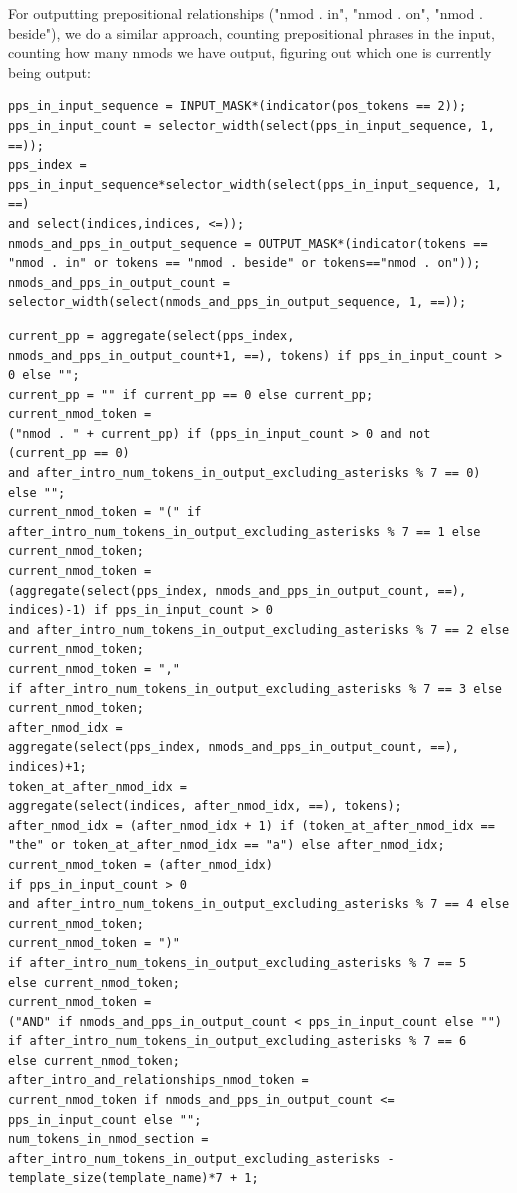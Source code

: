 \documentclass[11pt]{article}
\begin{document}
For outputting prepositional relationships ("nmod . in", "nmod . on", "nmod . beside"), we do a similar approach, counting prepositional phrases in the input, counting how many nmods we have output, figuring out which one is currently being output:

\begin{tiny}
\begin{verbatim}
pps_in_input_sequence = INPUT_MASK*(indicator(pos_tokens == 2));
pps_in_input_count = selector_width(select(pps_in_input_sequence, 1, ==));
pps_index = pps_in_input_sequence*selector_width(select(pps_in_input_sequence, 1, ==) 
and select(indices,indices, <=));
nmods_and_pps_in_output_sequence = OUTPUT_MASK*(indicator(tokens == "nmod . in" or tokens == "nmod . beside" or tokens=="nmod . on"));
nmods_and_pps_in_output_count = selector_width(select(nmods_and_pps_in_output_sequence, 1, ==));
\end{verbatim}
\end{tiny}

\begin{tiny}
\begin{verbatim}
current_pp = aggregate(select(pps_index, nmods_and_pps_in_output_count+1, ==), tokens) if pps_in_input_count > 0 else "";
current_pp = "" if current_pp == 0 else current_pp;
current_nmod_token = 
("nmod . " + current_pp) if (pps_in_input_count > 0 and not (current_pp == 0) 
and after_intro_num_tokens_in_output_excluding_asterisks % 7 == 0) else "";
current_nmod_token = "(" if after_intro_num_tokens_in_output_excluding_asterisks % 7 == 1 else current_nmod_token;
current_nmod_token = 
(aggregate(select(pps_index, nmods_and_pps_in_output_count, ==), indices)-1) if pps_in_input_count > 0 
and after_intro_num_tokens_in_output_excluding_asterisks % 7 == 2 else current_nmod_token;
current_nmod_token = "," 
if after_intro_num_tokens_in_output_excluding_asterisks % 7 == 3 else current_nmod_token;
after_nmod_idx = 
aggregate(select(pps_index, nmods_and_pps_in_output_count, ==), indices)+1;
token_at_after_nmod_idx = 
aggregate(select(indices, after_nmod_idx, ==), tokens);
after_nmod_idx = (after_nmod_idx + 1) if (token_at_after_nmod_idx == "the" or token_at_after_nmod_idx == "a") else after_nmod_idx;
current_nmod_token = (after_nmod_idx) 
if pps_in_input_count > 0 
and after_intro_num_tokens_in_output_excluding_asterisks % 7 == 4 else current_nmod_token;
current_nmod_token = ")" 
if after_intro_num_tokens_in_output_excluding_asterisks % 7 == 5 
else current_nmod_token;
current_nmod_token = 
("AND" if nmods_and_pps_in_output_count < pps_in_input_count else "") 
if after_intro_num_tokens_in_output_excluding_asterisks % 7 == 6 
else current_nmod_token;
after_intro_and_relationships_nmod_token = 
current_nmod_token if nmods_and_pps_in_output_count <= pps_in_input_count else "";
num_tokens_in_nmod_section = 
after_intro_num_tokens_in_output_excluding_asterisks - template_size(template_name)*7 + 1;
\end{verbatim}
\end{tiny}
\end{document}
